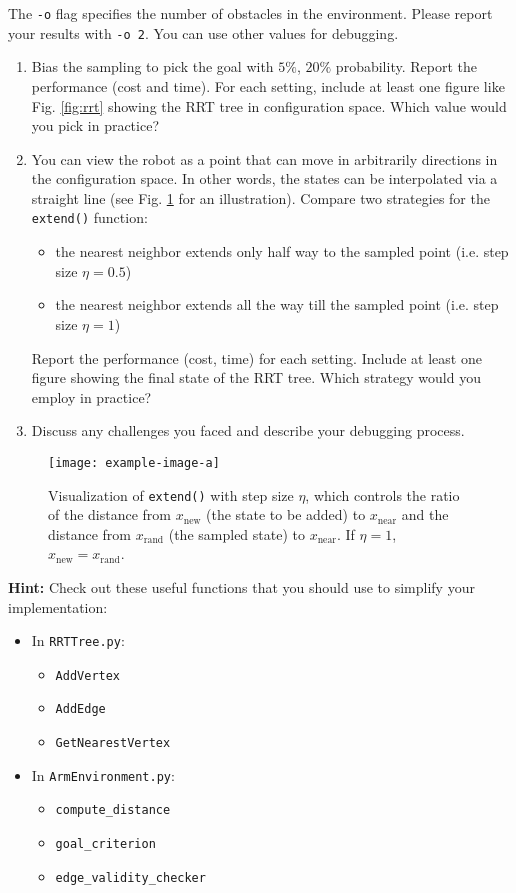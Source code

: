 \documentclass[tp]{lcc}
\begin{document}
The \texttt{-o} flag specifies the number of obstacles in the environment. Please report your results with \texttt{-o 2}. You can use other values for debugging.

\begin{enumerate}
    \item Bias the sampling to pick the goal with $5\%$, $20\%$ probability. Report the performance (cost and time). For each setting, include at least one figure like Fig. \ref{fig:rrt} showing the RRT tree in configuration space. Which value would you pick in practice?
    \item You can view the robot as a point that can move in arbitrarily directions in the configuration space. In other words, the states can be interpolated via a straight line (see Fig. \ref{fig:extend} for an illustration). Compare two strategies for the \texttt{extend()} function:
    \begin{itemize}
        \item the nearest neighbor extends only half way to the sampled point (i.e. step size $\eta=0.5$)
        \item the nearest neighbor extends all the way till the sampled point (i.e. step size $\eta=1$)
    \end{itemize}
    Report the performance (cost, time) for each setting. Include at least one figure showing the final state of the RRT tree. Which strategy would you employ in practice?
    \item Discuss any challenges you faced and describe your debugging process.
\end{enumerate}

\begin{figure}[h]
    \centering
    \texttt{[image: example-image-a]}
    \caption{Visualization of \texttt{extend()} with step size $\eta$, which controls the ratio of the distance from $x_{\text{new}}$ (the state to be added) to $x_{\text{near}}$ and the distance from $x_{\text{rand}}$ (the sampled state) to $x_{\text{near}}$. If $\eta=1$, $x_{\text{new}}=x_{\text{rand}}$.}
    \label{fig:extend}
\end{figure}

\textbf{Hint:}
Check out these useful functions that you should use to simplify your implementation:
\begin{itemize}
    \item In \texttt{RRTTree.py}:
    \begin{itemize}
        \item \texttt{AddVertex}
        \item \texttt{AddEdge}
        \item \texttt{GetNearestVertex}
    \end{itemize}
    \item In \texttt{ArmEnvironment.py}:
    \begin{itemize}
        \item \texttt{compute\_distance}
        \item \texttt{goal\_criterion}
        \item \texttt{edge\_validity\_checker}
    \end{itemize}
\end{itemize}
\end{document}
